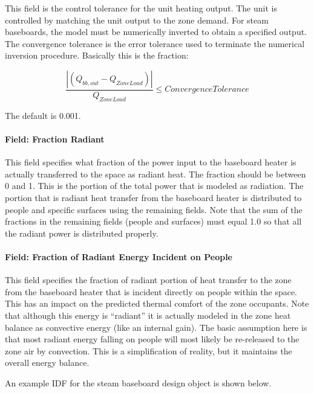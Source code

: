 This field is the control tolerance for the unit heating output. The unit is controlled by matching the unit output to the zone demand. For steam baseboards, the model must be numerically inverted to obtain a specified output. The convergence tolerance is the error tolerance used to terminate the numerical inversion procedure. Basically this is the fraction:

\begin{equation}
\frac{{\left| {({Q_{bb,out}} - {Q_{ZoneLoad}})} \right|}}{{{Q_{ZoneLoad}}}} \le Convergence Tolerance
\end{equation}

The default is 0.001.

\paragraph{Field: Fraction Radiant}\label{field-fraction-radiant-1-000}

This field specifies what fraction of the power input to the baseboard heater is actually transferred to the space as radiant heat. The fraction should be between 0 and 1. This is the portion of the total power that is modeled as radiation. The portion that is radiant heat transfer from the baseboard heater is distributed to people and specific surfaces using the remaining fields. Note that the sum of the fractions in the remaining fields (people and surfaces) must equal 1.0 so that all the radiant power is distributed properly.

\paragraph{Field: Fraction of Radiant Energy Incident on People}\label{field-fraction-of-radiant-energy-incident-on-people-1}

This field specifies the fraction of radiant portion of heat transfer to the zone from the baseboard heater that is incident directly on people within the space. This has an impact on the predicted thermal comfort of the zone occupants. Note that although this energy is ``radiant'' it is actually modeled in the zone heat balance as convective energy (like an internal gain). The basic assumption here is that most radiant energy falling on people will most likely be re-released to the zone air by convection. This is a simplification of reality, but it maintains the overall energy balance.

An example IDF for the steam baseboard design object is shown below.

